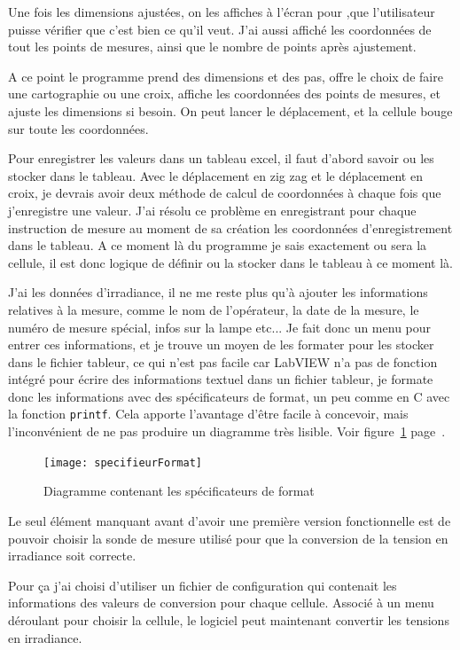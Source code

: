 \documentclass[12pt]{article}
\begin{document}
Une fois les dimensions ajustées, on les affiches à l'écran pour ,que l'utilisateur puisse vérifier que c'est bien ce qu'il veut.
J'ai aussi affiché les coordonnées de tout les points de mesures, ainsi que le nombre de points après ajustement.

A ce point le programme prend des dimensions et des pas, offre le choix de faire une cartographie ou une croix, affiche les coordonnées des points de mesures, et ajuste les dimensions si besoin.
On peut lancer le déplacement, et la cellule bouge sur toute les coordonnées.

Pour enregistrer les valeurs dans un tableau excel, il faut d'abord savoir ou les stocker dans le tableau.
Avec le déplacement en zig zag et le déplacement en croix, je devrais avoir deux méthode de calcul de coordonnées à chaque fois que j'enregistre une valeur.
J'ai résolu ce problème en enregistrant pour chaque instruction de mesure au moment de sa création les coordonnées d'enregistrement dans le tableau. A ce moment là du programme je sais exactement ou sera la cellule, il est donc logique de définir ou la stocker dans le tableau à ce moment là.

J'ai les données d'irradiance, il ne me reste plus qu'à ajouter les informations relatives à la mesure, comme le nom de l'opérateur, la date de la mesure, le numéro de mesure spécial, infos sur la lampe etc...
Je fait donc un menu pour entrer ces informations, et je trouve un moyen de les formater pour les stocker dans le fichier tableur, ce qui n'est pas facile car LabVIEW n'a pas de fonction intégré pour écrire des informations textuel dans un fichier tableur, je formate donc les informations avec des spécificateurs de format, un peu comme en C avec la fonction \verb|printf|.
Cela apporte l'avantage d'être facile à concevoir, mais l'inconvénient de ne pas produire un diagramme très lisible.
Voir figure~\ref{fig:specifieurFormat} page~\pageref{fig:specifieurFormat}.

\begin{figure}[h]
	\centering
	\texttt{[image: specifieurFormat]}
	\caption{Diagramme contenant les spécificateurs de format}
	\label{fig:specifieurFormat}
\end{figure}

Le seul élément manquant avant d'avoir une première version fonctionnelle est de pouvoir choisir la sonde de mesure utilisé pour que la conversion de la tension en irradiance soit correcte.

Pour ça j'ai choisi d'utiliser un fichier de configuration qui contenait les informations des valeurs de conversion pour chaque cellule. Associé à un menu déroulant pour choisir la cellule, le logiciel peut maintenant convertir les tensions en irradiance.
\end{document}
